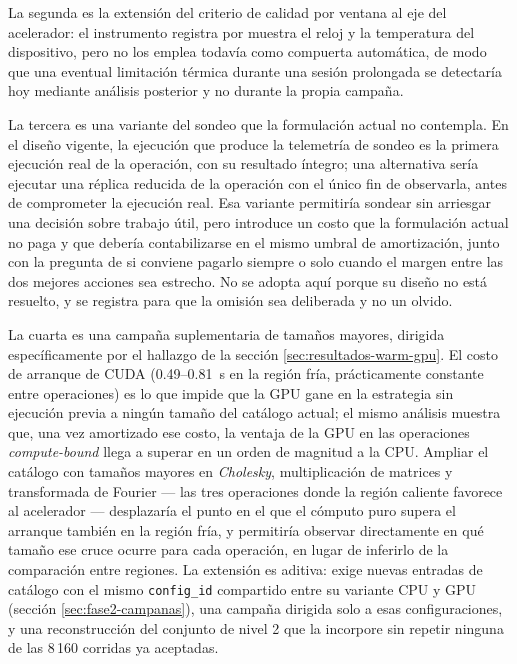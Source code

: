 \documentclass[12pt,oneside,spanish]{book}
\begin{document}
La segunda es la extensión del criterio de calidad por ventana al eje del acelerador: el instrumento registra por muestra el reloj y la temperatura del dispositivo, pero no los emplea todavía como compuerta automática, de modo que una eventual limitación térmica durante una sesión prolongada se detectaría hoy mediante análisis posterior y no durante la propia campaña.

La tercera es una variante del sondeo que la formulación actual no contempla. En el diseño vigente, la ejecución que produce la telemetría de sondeo es la primera ejecución real de la operación, con su resultado íntegro; una alternativa sería ejecutar una réplica reducida de la operación con el único fin de observarla, antes de comprometer la ejecución real. Esa variante permitiría sondear sin arriesgar una decisión sobre trabajo útil, pero introduce un costo que la formulación actual no paga y que debería contabilizarse en el mismo umbral de amortización, junto con la pregunta de si conviene pagarlo siempre o solo cuando el margen entre las dos mejores acciones sea estrecho. No se adopta aquí porque su diseño no está resuelto, y se registra para que la omisión sea deliberada y no un olvido.

La cuarta es una campaña suplementaria de tamaños mayores, dirigida específicamente por el hallazgo de la sección \ref{sec:resultados-warm-gpu}. El costo de arranque de CUDA (0.49--0.81~s en la región fría, prácticamente constante entre operaciones) es lo que impide que la GPU gane en la estrategia sin ejecución previa a ningún tamaño del catálogo actual; el mismo análisis muestra que, una vez amortizado ese costo, la ventaja de la GPU en las operaciones \textit{compute-bound} llega a superar en un orden de magnitud a la CPU. Ampliar el catálogo con tamaños mayores en \textit{Cholesky}, multiplicación de matrices y transformada de Fourier --- las tres operaciones donde la región caliente favorece al acelerador --- desplazaría el punto en el que el cómputo puro supera el arranque también en la región fría, y permitiría observar directamente en qué tamaño ese cruce ocurre para cada operación, en lugar de inferirlo de la comparación entre regiones. La extensión es aditiva: exige nuevas entradas de catálogo con el mismo \texttt{config\_id} compartido entre su variante CPU y GPU (sección \ref{sec:fase2-campanas}), una campaña dirigida solo a esas configuraciones, y una reconstrucción del conjunto de nivel 2 que la incorpore sin repetir ninguna de las 8\,160 corridas ya aceptadas.

\end{document}
